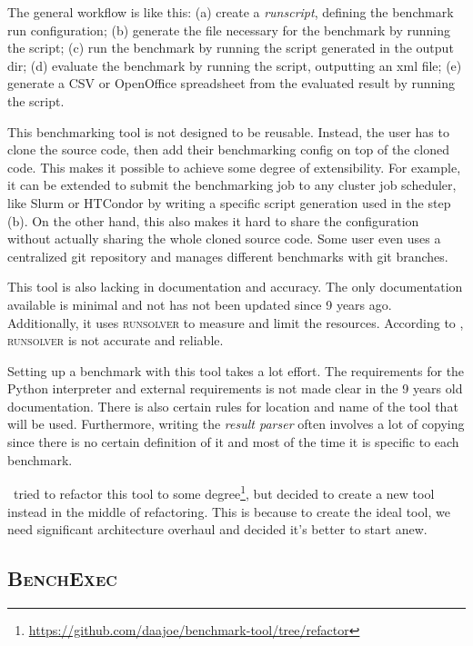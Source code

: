 The general workflow is like this:
(a) create a \textit{runscript}, defining the benchmark run configuration;
(b) generate the file necessary for the benchmark by running the  script;
(c) run the benchmark by running the script generated in the output dir;
(d) evaluate the benchmark by running the  script, outputting an xml file;
(e) generate a CSV or OpenOffice spreadsheet from the evaluated result by running the  script.

This benchmarking tool is not designed to be reusable.
Instead, the user has to clone the source code, then add their benchmarking config on top of the cloned code.
This makes it possible to achieve some degree of extensibility.
For example, it can be extended to submit the benchmarking job to any cluster job scheduler, like Slurm or HTCondor by writing a specific script generation used in the step (b).
On the other hand, this also makes it hard to share the configuration without actually sharing the whole cloned source code.
Some user even uses a centralized git repository and manages different benchmarks with git branches.

This tool is also lacking in documentation and accuracy.
The only documentation available is minimal and not has not been updated since 9 years ago.
Additionally, it uses \textsc{runsolver} to measure and limit the resources.
According to \citet{beyerReliableBenchmarkingRequirements2019}, \textsc{runsolver} is not accurate and reliable.

Setting up a benchmark with this tool takes a lot effort.
The requirements for the Python interpreter and external requirements is not made clear in the 9 years old documentation.
There is also certain rules for location and name of the tool that will be used.
Furthermore, writing the \textit{result parser} often involves a lot of copying since there is no certain definition of it and most of the time it is specific to each benchmark.

\First~tried to refactor this tool to some degree\footnote{\href{https://github.com/daajoe/benchmark-tool/tree/refactor}{https://github.com/daajoe/benchmark-tool/tree/refactor}}, but decided to create a new tool instead in the middle of refactoring.
This is because to create the ideal tool, we need significant architecture overhaul and decided it's better to start anew.

\subsection{\textsc{BenchExec}}

